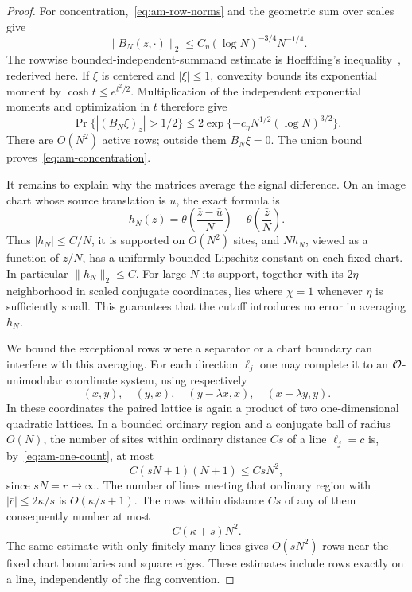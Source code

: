 \begin{proof}
For concentration,~\eqref{eq:am-row-norms} and the geometric sum over scales
give
\[
 \|B_N(z,\cdot)\|_2
 \le C_\eta(\log N)^{-3/4}N^{-1/4}.
\]
The rowwise bounded-independent-summand estimate is Hoeffding's
inequality~\cite[Theorem~2]{Hoeffding1963}, rederived here.
If $\xi$ is centered and $|\xi|\le1$, convexity bounds its exponential
moment by $\cosh t\le e^{t^2/2}$.  Multiplication of the independent
exponential moments and optimization in $t$ therefore give
\[
 \Pr\{|(B_N\xi)_z|>1/2\}
 \le 2\exp\{-c_\eta N^{1/2}(\log N)^{3/2}\}.
\]
There are $O(N^2)$ active rows; outside them $B_N\xi=0$.  The union bound
proves~\eqref{eq:am-concentration}.

It remains to explain why the matrices average the signal difference.
On an image chart whose source translation is $u$, the exact formula is
\[
 h_N(z)=\theta\left(\frac{\bar z-\bar u}{N}\right)
              -\theta\left(\frac{\bar z}{N}\right).
\]
Thus $|h_N|\le C/N$, it is supported on $O(N^2)$ sites, and $Nh_N$,
viewed as a function of $\bar z/N$, has a uniformly bounded Lipschitz
constant on each fixed chart.  In particular $\|h_N\|_2\le C$.
For large $N$ its support, together with its $2\eta$-neighborhood in scaled
conjugate coordinates, lies where $\chi=1$ whenever $\eta$ is sufficiently
small.  This guarantees that the cutoff introduces no error in averaging
$h_N$.

We bound the exceptional rows where a separator or a chart boundary can
interfere with this averaging.  For each direction $\ell_j$ one may complete
it to an $\mathcal O$-unimodular coordinate system, using respectively
\[
 (x,y),\quad(y,x),\quad(y-\lambda x,x),\quad(x-\lambda y,y).
\]
In these coordinates the paired lattice is again a product of two
one-dimensional quadratic lattices.  In a bounded ordinary region and a
conjugate ball of radius $O(N)$, the number of sites within ordinary distance
$C s$ of a line $\ell_j=c$ is, by~\eqref{eq:am-one-count}, at most
\[
 C(sN+1)(N+1)\le C sN^2,
\]
since $sN=r\to\infty$.  The number of lines meeting that ordinary region
with $|\bar c|\le2\kappa/s$ is $O(\kappa/s+1)$.  The rows within distance
$Cs$ of any of them consequently number at most
\begin{equation}\label{eq:am-bad-rows}
 C(\kappa+s)N^2.
\end{equation}
The same estimate with only finitely many lines gives $O(sN^2)$ rows near
the fixed chart boundaries and square edges.  These estimates include rows
exactly on a line, independently of the flag convention.


\end{proof}
